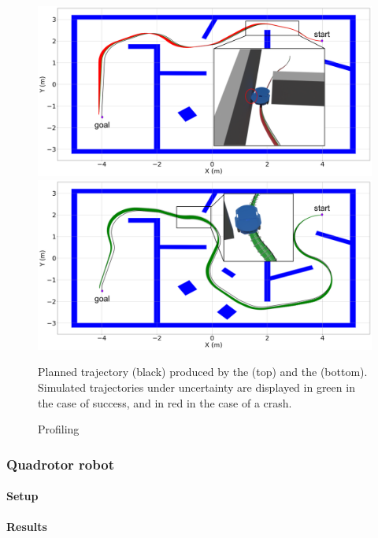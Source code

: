 \begin{figure} [t]
    \centering
    \includegraphics[width=0.9\linewidth]{figures/samp/non_robust_unic.png}
    \includegraphics[width=0.9\linewidth]{figures/samp/robust_unic.png}
    \caption{Planned trajectory (black) produced by the  (top) and the  (bottom). 
    Simulated trajectories under uncertainty are displayed in green in the case of success, and in red in the case of a crash.}%
    \label{fig:robust_unic}%
\end{figure}

\begin{figure} [t]
    \centering
     
    \caption{Profiling }%
    \label{fig:profiling_unic}%
\end{figure}

\subsubsection{Quadrotor robot}

\paragraph{Setup}



\paragraph{Results}


